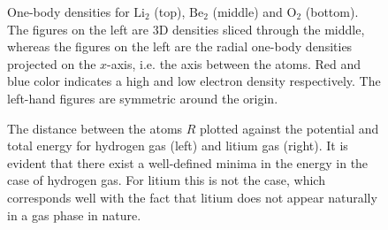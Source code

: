\begin{figure}
\begin{center}
  \caption{One-body densities for $\mathrm{Li_2}$ (top), $\mathrm{Be_2}$ (middle) and $\mathrm{O_2}$ (bottom). The figures on the left are 3D densities sliced through the middle, whereas the figures on the left are the radial one-body densities projected on the $x$-axis, i.e. the axis between the atoms. Red and blue color indicates a high and low electron density respectively. The left-hand figures are symmetric around the origin.}
  \label{fig:OBD_Molecules}
 \end{center}
\end{figure}



\begin{figure}
 \begin{center}
  \caption{The distance between the atoms $R$ plotted against the potential and total energy for hydrogen gas (left) and litium gas (right). It is evident that there exist a well-defined minima in the energy in the case of hydrogen gas. For litium this is not the case, which corresponds well with the fact that litium does not appear naturally in a gas phase in nature.}
  \label{fig:molecules_R_vs_E}
 \end{center}
\end{figure}
